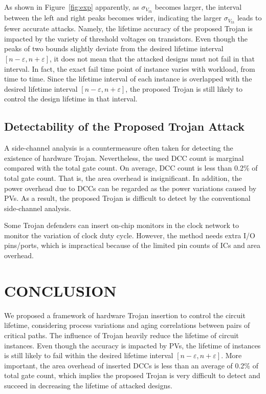 As shown in Figure~\ref{fig:exp} apparently, as $\sigma_{V_{th}}$ becomes larger, the interval between the left and right peaks becomes wider, indicating the larger $\sigma_{V_{th}}$ leads to fewer accurate attacks. Namely, the lifetime accuracy of the proposed Trojan is impacted by the variety of threshold voltages on transistors. Even though the peaks of two bounds slightly deviate from the desired lifetime interval $[n - \varepsilon, n + \varepsilon]$, it does not mean that the attacked designs must not fail in that interval. In fact, the exact fail time point of instance varies with workload, from time to time. Since the lifetime interval of each instance is overlapped with the desired lifetime interval $[n - \varepsilon, n + \varepsilon]$, the proposed Trojan is still likely to control the design lifetime in that interval.

\subsection{Detectability of the Proposed Trojan Attack}
\label{sec:exp:det}
A side-channel analysis is a countermeasure often taken for detecting the existence of hardware Trojan. Nevertheless, the used DCC count is marginal compared with the total gate count. On average, DCC count is less than 0.2\% of total gate count. That is, the area overhead is insignificant. In addition, the power overhead due to DCCs can be regarded as the power variations caused by PVs. As a result, the proposed Trojan is difficult to detect by the conventional side-channel analysis. 

Some Trojan defenders can insert on-chip monitors in the clock network to monitor the variation of clock duty cycle. However, the method needs extra I/O pins/ports, which is impractical because of the limited pin counts of ICs and area overhead.


\section{CONCLUSION}
We proposed a framework of hardware Trojan insertion to control the circuit lifetime, considering process variations and aging correlations between pairs of critical paths. The influence of Trojan heavily reduce the lifetime of circuit instances. Even though the accuracy is impacted by PVs, the lifetime of instances is still likely to fail within the desired lifetime interval $[n - \varepsilon, n + \varepsilon]$. More important, the area overhead of inserted DCCs is less than an average of 0.2\% of total gate count, which implies the proposed Trojan is very difficult to detect and succeed in decreasing the lifetime of attacked designs.

